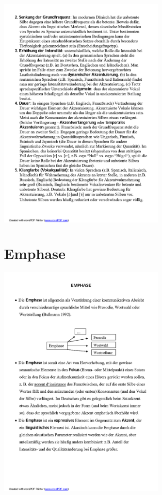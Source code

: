 \documentclass[
  letterpaper,
]{scrbook}
\begin{document}
\includegraphics[width=3.31in,height=\textheight]{./pictures/prosodie/06_Prosodie_Folie_2005-06_R_Page9.png}

\hypertarget{emphase}{%
\section{Emphase}\label{emphase}}

\includegraphics[width=3.31in,height=\textheight]{./pictures/prosodie/06_Prosodie_Folie_2005-06_R_Page10.png}
\end{document}
